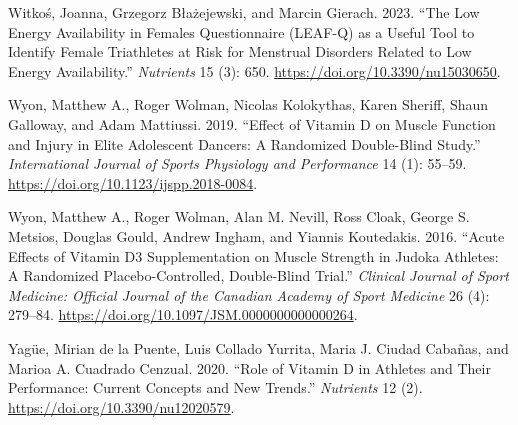 \documentclass[
]{article}
\newlength{\cslhangindent}
\newenvironment{CSLReferences}[2] %
 {\begin{list}{}{%
  \setlength{\itemindent}{0pt}
  \setlength{\leftmargin}{0pt}
  \setlength{\parsep}{0pt}
  \ifodd #1
   \setlength{\leftmargin}{\cslhangindent}
   \setlength{\itemindent}{-1\cslhangindent}
  \fi
  \setlength{\itemsep}{#2\baselineskip}}}
 {\end{list}}
\begin{document}
\begin{CSLReferences}{1}{0}
Witkoś, Joanna, Grzegorz Błażejewski, and Marcin Gierach. 2023. {``The {Low} {Energy} {Availability} in {Females} {Questionnaire} ({LEAF}-{Q}) as a {Useful} {Tool} to {Identify} {Female} {Triathletes} at {Risk} for {Menstrual} {Disorders} {Related} to {Low} {Energy} {Availability}.''} \emph{Nutrients} 15 (3): 650. \url{https://doi.org/10.3390/nu15030650}.

Wyon, Matthew A., Roger Wolman, Nicolas Kolokythas, Karen Sheriff, Shaun Galloway, and Adam Mattiussi. 2019. {``Effect of {Vitamin} {D} on {Muscle} {Function} and {Injury} in {Elite} {Adolescent} {Dancers}: {A} {Randomized} {Double}-{Blind} {Study}.''} \emph{International Journal of Sports Physiology and Performance} 14 (1): 55--59. \url{https://doi.org/10.1123/ijspp.2018-0084}.

Wyon, Matthew A., Roger Wolman, Alan M. Nevill, Ross Cloak, George S. Metsios, Douglas Gould, Andrew Ingham, and Yiannis Koutedakis. 2016. {``Acute {Effects} of {Vitamin} {D3} {Supplementation} on {Muscle} {Strength} in {Judoka} {Athletes}: {A} {Randomized} {Placebo}-{Controlled}, {Double}-{Blind} {Trial}.''} \emph{Clinical Journal of Sport Medicine: Official Journal of the Canadian Academy of Sport Medicine} 26 (4): 279--84. \url{https://doi.org/10.1097/JSM.0000000000000264}.

Yagüe, Mirian de la Puente, Luis Collado Yurrita, Maria J. Ciudad Cabañas, and Marioa A. Cuadrado Cenzual. 2020. {``Role of {Vitamin} {D} in {Athletes} and {Their} {Performance}: {Current} {Concepts} and {New} {Trends}.''} \emph{Nutrients} 12 (2). \url{https://doi.org/10.3390/nu12020579}.

\end{CSLReferences}
\end{document}
